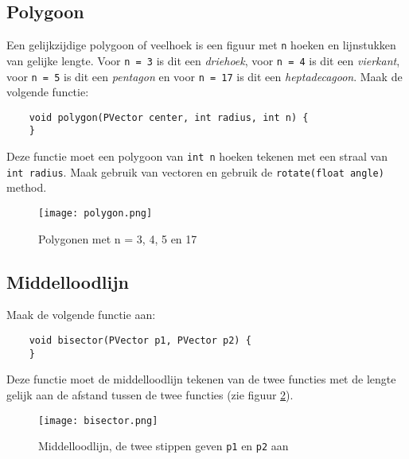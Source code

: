 \subsection{Polygoon}
Een gelijkzijdige polygoon of veelhoek is een figuur met \texttt{n} hoeken en lijnstukken van gelijke lengte. Voor \texttt{n = 3} is dit een \textit{driehoek}, voor \texttt{n = 4} is dit een \textit{vierkant}, voor \texttt{n = 5} is dit een \textit{pentagon} en voor \texttt{n = 17} is dit een \textit{heptadecagoon}. Maak de volgende functie:
\begin{lstlisting}
	void polygon(PVector center, int radius, int n) {
	}
\end{lstlisting}
Deze functie moet een polygoon van \texttt{int n} hoeken tekenen met een straal van \texttt{int radius}. Maak gebruik van vectoren en gebruik de \texttt{rotate(float angle)} method. \\
\begin{figure}[h!]
	\centering
	\texttt{[image: polygon.png]}
	\caption{Polygonen met n = 3, 4, 5 en 17}
	\label{fig:polygon}
\end{figure}


\subsection{Middelloodlijn}
Maak de volgende functie aan:
\begin{lstlisting}
	void bisector(PVector p1, PVector p2) {
	}
\end{lstlisting}
Deze functie moet de middelloodlijn tekenen van de twee functies met de lengte gelijk aan de afstand tussen de twee functies (zie figuur \ref{fig:bisector}). 
\begin{figure}[H]
	\centering
	\texttt{[image: bisector.png]}
	\caption{Middelloodlijn, de twee stippen geven \texttt{p1} en \texttt{p2} aan}
	\label{fig:bisector}
\end{figure}


